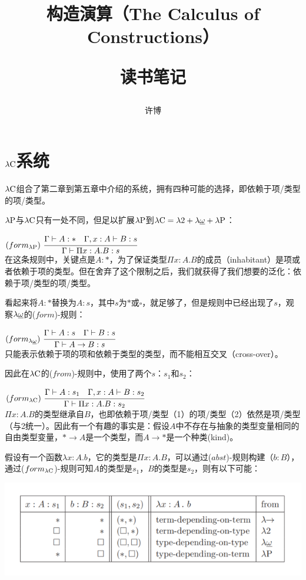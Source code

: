 \documentclass[UTF8]{article}
\title{构造演算（The Calculus of Constructions）\\[2ex]\begin{large}读书笔记\end{large}}
\author{许博}
\date{}
\begin{document}
\maketitle
	\section{$\lambda{\rm C}$系统}
	\noindent
	$\lambda{\rm C}$组合了第二章到第五章中介绍的系统，拥有四种可能的选择，即依赖于项/类型的项/类型。
		
		$\lambda{\rm P}$与$\lambda{\rm C}$只有一处不同，但足以扩展$\lambda{\rm P}$到$\lambda{\rm C} = \lambda{2} + \lambda{\uline{\omega}} + \lambda{\rm P}$：
		
		$(form_{\lambda{\rm P}})\ \cfrac{\Gamma\vdash A:*\ \ \ \Gamma,x:A\vdash B:s}{\Gamma\vdash\Pi x:A.B:s}$\\
		
		在这条规则中，关键点是$A:*$，为了保证类型$\Pi x:A.B$的成员（inhabitant）是项或者依赖于项的类型。但在舍弃了这个限制之后，我们就获得了我们想要的泛化：依赖于项/类型的项/类型。
		
		看起来将$A:*$替换为$A:s$，其中$s$为$*$或$\square$，就足够了，但是规则中已经出现了$s$，观察$\lambda{\uline{\omega}}$的($form$)-规则：
		
		$(form_{\lambda{\uline{\omega}}})\ \cfrac{\Gamma\vdash A:s\ \ \ \Gamma\vdash B:s}{\Gamma\vdash A\rightarrow B:s}$\\
		
		只能表示依赖于项的项和依赖于类型的类型，而不能相互交叉（cross-over）。
		
		因此在$\lambda{\rm C}$的($from$)-规则中，使用了两个$s$：$s_1$和$s_2$：
		
		$(form_{\lambda{\rm C}})\ \cfrac{\Gamma\vdash A:s_1\ \ \ \Gamma,x:A\vdash B:s_2}{\Gamma\vdash\Pi x:A.B:s_2}$\\
		
		$\Pi x:A.B$的类型继承自$B$，也即依赖于项/类型（1）的项/类型（2）依然是项/类型（与2统一）。因此有一个有趣的事实是：假设$A$中不存在与抽象的类型变量相同的自由类型变量，$*\rightarrow A$是一个类型，而$A\rightarrow *$是一个种类(kind)。
		
		假设有一个函数$\lambda x:A.b$，它的类型是$\Pi x:A.B$，可以通过($abst$)-规则构建（$b:B$），通过($form_{\lambda{\rm C}}$)-规则可知$A$的类型是$s_1$，$B$的类型是$s_2$，则有以下可能：
		
		\noindent
		\includegraphics[width=0.93\linewidth]{"../imgs/6-1.png"}
		
\end{document}
